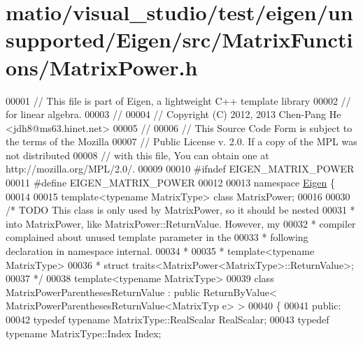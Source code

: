 \hypertarget{matio_2visual__studio_2test_2eigen_2unsupported_2_eigen_2src_2_matrix_functions_2_matrix_power_8h_source}{}\section{matio/visual\+\_\+studio/test/eigen/unsupported/\+Eigen/src/\+Matrix\+Functions/\+Matrix\+Power.h}
\label{matio_2visual__studio_2test_2eigen_2unsupported_2_eigen_2src_2_matrix_functions_2_matrix_power_8h_source}

\begin{DoxyCode}
00001 \textcolor{comment}{// This file is part of Eigen, a lightweight C++ template library}
00002 \textcolor{comment}{// for linear algebra.}
00003 \textcolor{comment}{//}
00004 \textcolor{comment}{// Copyright (C) 2012, 2013 Chen-Pang He <jdh8@ms63.hinet.net>}
00005 \textcolor{comment}{//}
00006 \textcolor{comment}{// This Source Code Form is subject to the terms of the Mozilla}
00007 \textcolor{comment}{// Public License v. 2.0. If a copy of the MPL was not distributed}
00008 \textcolor{comment}{// with this file, You can obtain one at http://mozilla.org/MPL/2.0/.}
00009 
00010 \textcolor{preprocessor}{#ifndef EIGEN\_MATRIX\_POWER}
00011 \textcolor{preprocessor}{#define EIGEN\_MATRIX\_POWER}
00012 
00013 \textcolor{keyword}{namespace }\hyperlink{namespace_eigen}{Eigen} \{
00014 
00015 \textcolor{keyword}{template}<\textcolor{keyword}{typename} MatrixType> \textcolor{keyword}{class }MatrixPower;
00016 
00030 \textcolor{comment}{/* TODO This class is only used by MatrixPower, so it should be nested}
00031 \textcolor{comment}{ * into MatrixPower, like MatrixPower::ReturnValue. However, my}
00032 \textcolor{comment}{ * compiler complained about unused template parameter in the}
00033 \textcolor{comment}{ * following declaration in namespace internal.}
00034 \textcolor{comment}{ *}
00035 \textcolor{comment}{ * template<typename MatrixType>}
00036 \textcolor{comment}{ * struct traits<MatrixPower<MatrixType>::ReturnValue>;}
00037 \textcolor{comment}{ */}
00038 \textcolor{keyword}{template}<\textcolor{keyword}{typename} MatrixType>
00039 \textcolor{keyword}{class }MatrixPowerParenthesesReturnValue : \textcolor{keyword}{public} ReturnByValue< MatrixPowerParenthesesReturnValue<MatrixTyp
      e> >
00040 \{
00041   \textcolor{keyword}{public}:
00042     \textcolor{keyword}{typedef} \textcolor{keyword}{typename} MatrixType::RealScalar RealScalar;
00043     \textcolor{keyword}{typedef} \textcolor{keyword}{typename} MatrixType::Index Index;

\end{DoxyCode}
